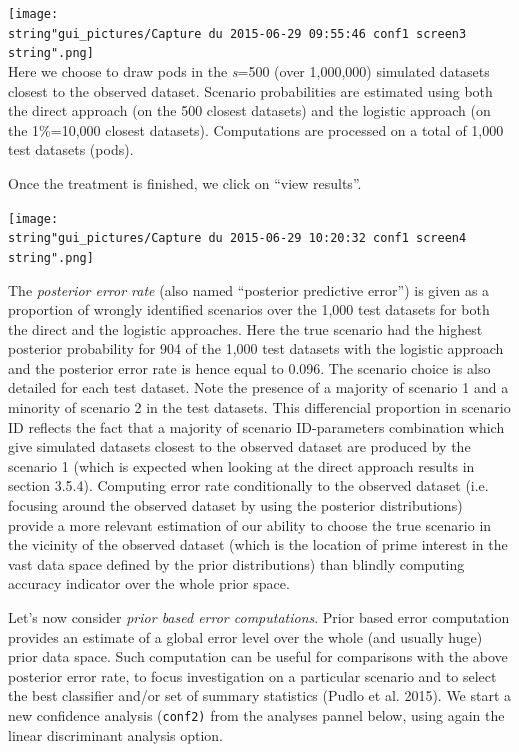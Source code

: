 \texttt{[image: \\string"gui\_pictures/Capture du 2015-06-29 09:55:46 conf1 screen3\\string".png]}\\
Here we choose to draw pods in the \textit{s}=500 (over 1,000,000)
simulated datasets closest to the observed dataset. Scenario probabilities
are estimated using both the direct approach (on the 500 closest datasets)
and the logistic approach (on the 1\%=10,000 closest datasets). Computations
are processed on a total of 1,000 test datasets (pods).

Once the treatment is finished, we click on ``view results''.

\texttt{[image: \\string"gui\_pictures/Capture du 2015-06-29 10:20:32 conf1 screen4\\string".png]}

The \textit{posterior error rate} (also named ``posterior predictive
error'') is given as a proportion of wrongly identified scenarios
over the 1,000 test datasets for both the direct and the logistic
approaches. Here the true scenario had the highest posterior probability
for 904 of the 1,000 test datasets with the logistic approach and
the posterior error rate is hence equal to 0.096. The scenario choice
is also detailed for each test dataset. Note the presence of a majority
of scenario 1 and a minority of scenario 2 in the test datasets. This
differencial proportion in scenario ID reflects the fact that a majority
of scenario ID-parameters combination which give simulated datasets
closest to the observed dataset are produced by the scenario 1 (which
is expected when looking at the direct approach results in section
3.5.4). Computing error rate conditionally to the observed dataset
(i.e. focusing around the observed dataset by using the posterior
distributions) provide a more relevant estimation of our ability to
choose the true scenario in the vicinity of the observed dataset (which
is the location of prime interest in the vast data space defined by
the prior distributions) than blindly computing accuracy indicator
over the whole prior space.

Let's now consider \textit{prior based error computations}. Prior
based error computation provides an estimate of a global error level
over the whole (and usually huge) prior data space. Such computation
can be useful for comparisons with the above posterior error rate,
to focus investigation on a particular scenario and to select the
best classifier and/or set of summary statistics (Pudlo et al. 2015).
We start a new confidence analysis (\texttt{conf2)} from the analyses
pannel below, using again the linear discriminant analysis option.

